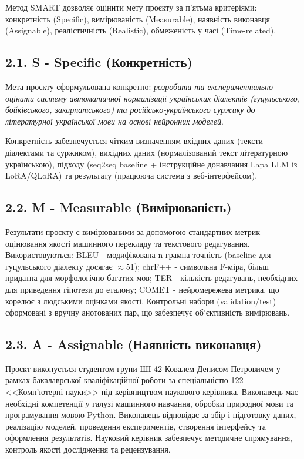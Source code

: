 \documentclass[14pt]{extarticle}
\begin{document}
Метод SMART дозволяє оцінити мету проєкту за п'ятьма критеріями: конкретність (Specific), вимірюваність (Measurable), наявність виконавця (Assignable), реалістичність (Realistic), обмеженість у часі (Time-related).

\subsection*{2.1. S - Specific (Конкретність)}

Мета проєкту сформульована конкретно: \textit{розробити та експериментально оцінити систему автоматичної нормалізації українських діалектів (гуцульського, бойківського, закарпатського) та російсько-українського суржику до літературної української мови на основі нейронних моделей}.

Конкретність забезпечується чітким визначенням вхідних даних (тексти діалектами та суржиком), вихідних даних (нормалізований текст літературною українською), підходу (seq2seq baseline + інструкційне донавчання Lapa LLM із LoRA/QLoRA) та результату (працююча система з веб-інтерфейсом).

\subsection*{2.2. M - Measurable (Вимірюваність)}

Результати проєкту є вимірюваними за допомогою стандартних метрик оцінювання якості машинного перекладу та текстового редагування. Використовуються: BLEU - модифікована n-грамна точність (baseline для гуцульського діалекту досягає $\approx$51); chrF++ - символьна F-міра, більш придатна для морфологічно багатих мов; TER - кількість редагувань, необхідних для приведення гіпотези до еталону; COMET - нейромережева метрика, що корелює з людськими оцінками якості. Контрольні набори (validation/test) сформовані з вручну анотованих пар, що забезпечує об'єктивність вимірювань.

\subsection*{2.3. A - Assignable (Наявність виконавця)}

Проєкт виконується студентом групи ШІ-42 Ковалем Денисом Петровичем у рамках бакалаврської кваліфікаційної роботи за спеціальністю 122 <<Комп'ютерні науки>> під керівництвом наукового керівника. Виконавець має необхідні компетенції у галузі машинного навчання, обробки природної мови та програмування мовою Python. Виконавець відповідає за збір і підготовку даних, реалізацію моделей, проведення експериментів, створення інтерфейсу та оформлення результатів. Науковий керівник забезпечує методичне спрямування, контроль якості дослідження та рецензування.
\end{document}
